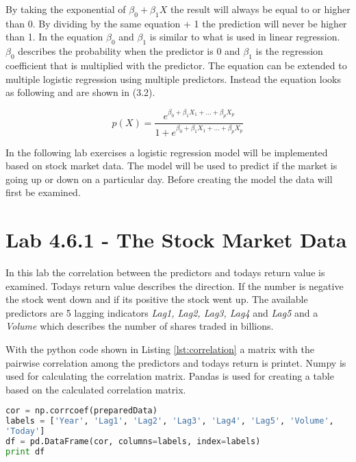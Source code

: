 By taking the exponential of $\beta_0 + \beta_1 X$ the result will always be equal to or higher than 0. By dividing by the same equation + 1 the prediction will never be higher than 1. In the equation $\beta_0$ and $\beta_1$ is similar to what is used in linear regression. $\beta_0$ describes the probability when the predictor is 0 and $\beta_1$ is the regression coefficient that is multiplied  with the predictor. The equation can be extended to multiple logistic regression using multiple predictors. Instead the equation looks as following and are shown in (3.2).


\begin{equation}
	p(X) = \dfrac{e^{\beta_0 + \beta_1 X_1 + ... + \beta_p X_p}}{1 + e^{\beta_0 + \beta_1 X_1 + ... + \beta_p X_p}}
\end{equation}


In the following lab exercises a logistic regression model will be implemented based on stock market data. The model will be used to predict if the market is going up or down on a particular day. Before creating the model the data will first be examined.

\section{Lab 4.6.1 - The Stock Market Data}
In this lab the correlation between the predictors and todays return value is examined. Todays return value describes the direction. If the number is negative the stock went down and if its positive the stock went up. The available predictors are 5 lagging indicators \emph{Lag1, Lag2, Lag3, Lag4} and \emph{Lag5} and a \emph{Volume} which describes the number of shares traded in billions.

With the python code shown in Listing \ref{lst:correlation} a matrix with the pairwise correlation among the predictors and todays return is printet. Numpy is used for calculating the correlation matrix. Pandas is used for creating a table based on the calculated correlation matrix.
\begin{lstlisting}[language=Python, label=lst:correlation, caption=Print correlation matrix]
cor = np.corrcoef(preparedData)
labels = ['Year', 'Lag1', 'Lag2', 'Lag3', 'Lag4', 'Lag5', 'Volume', 
'Today']
df = pd.DataFrame(cor, columns=labels, index=labels)
print df
\end{lstlisting}

